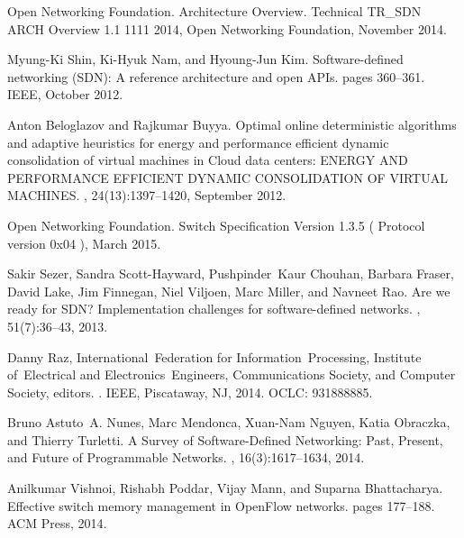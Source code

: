 \begin{thebibliography}{10}
{Open Networking Foundation}.
 {Architecture} {Overview}.
\newblock Technical TR\_SDN ARCH Overview 1.1 1111 2014, Open Networking
  Foundation, November 2014.

Myung-Ki Shin, Ki-Hyuk Nam, and Hyoung-Jun Kim.
\newblock Software-defined networking ({SDN}): {A} reference architecture and
  open {APIs}.
\newblock pages 360--361. IEEE, October 2012.

Anton Beloglazov and Rajkumar Buyya.
\newblock Optimal online deterministic algorithms and adaptive heuristics for
  energy and performance efficient dynamic consolidation of virtual machines in
  {Cloud} data centers: {ENERGY} {AND} {PERFORMANCE} {EFFICIENT} {DYNAMIC}
  {CONSOLIDATION} {OF} {VIRTUAL} {MACHINES}.
,
  24(13):1397--1420, September 2012.

{Open Networking Foundation}.
 {Switch} {Specification} {Version} 1.3.5 ( {Protocol}
  version 0x04 ), March 2015.

Sakir Sezer, Sandra Scott-Hayward, Pushpinder~Kaur Chouhan, Barbara Fraser,
  David Lake, Jim Finnegan, Niel Viljoen, Marc Miller, and Navneet Rao.
\newblock Are we ready for {SDN}? {Implementation} challenges for
  software-defined networks.
, 51(7):36--43, 2013.

Danny Raz, International~Federation for Information~Processing, Institute
  of~Electrical {and} Electronics~Engineers, Communications Society, and
  Computer Society, editors.
.
\newblock IEEE, Piscataway, NJ, 2014.
\newblock OCLC: 931888885.

Bruno Astuto~A. Nunes, Marc Mendonca, Xuan-Nam Nguyen, Katia Obraczka, and
  Thierry Turletti.
\newblock A {Survey} of {Software}-{Defined} {Networking}: {Past}, {Present},
  and {Future} of {Programmable} {Networks}.
, 16(3):1617--1634,
  2014.

Anilkumar Vishnoi, Rishabh Poddar, Vijay Mann, and Suparna Bhattacharya.
\newblock Effective switch memory management in {OpenFlow} networks.
\newblock pages 177--188. ACM Press, 2014.


\end{thebibliography}
